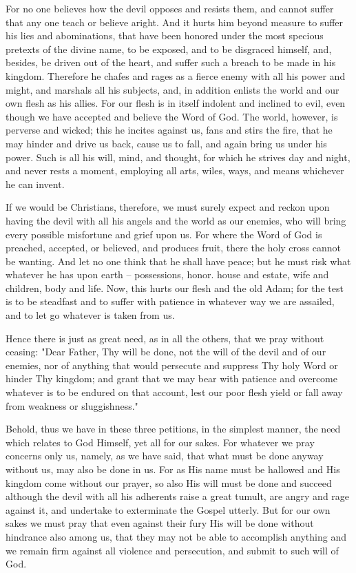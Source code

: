 For no one believes how the devil opposes and resists them, and cannot
suffer that any one teach or believe aright. And it hurts him beyond
measure to suffer his lies and abominations, that have been honored
under the most specious pretexts of the divine name, to be exposed, and
to be disgraced himself, and, besides, be driven out of the heart, and
suffer such a breach to be made in his kingdom. Therefore he chafes and
rages as a fierce enemy with all his power and might, and marshals all
his subjects, and, in addition enlists the world and our own flesh as
his allies. For our flesh is in itself indolent and inclined to evil,
even though we have accepted and believe the Word of God. The world,
however, is perverse and wicked; this he incites against us, fans and
stirs the fire, that he may hinder and drive us back, cause us to
fall, and again bring us under his power. Such is all his will, mind,
and thought, for which he strives day and night, and never rests a
moment, employing all arts, wiles, ways, and means whichever he can
invent.

If we would be Christians, therefore, we must surely expect and reckon
upon having the devil with all his angels and the world as our enemies,
who will bring every possible misfortune and grief upon us. For where
the Word of God is preached, accepted, or believed, and produces fruit,
there the holy cross cannot be wanting. And let no one think that he
shall have peace; but he must risk what whatever he has upon earth --
possessions, honor. house and estate, wife and children, body and life.
Now, this hurts our flesh and the old Adam; for the test is to be
steadfast and to suffer with patience in whatever way we are assailed,
and to let go whatever is taken from us.

Hence there is just as great need, as in all the others, that we pray
without ceasing: "Dear Father, Thy will be done, not the will of the
devil and of our enemies, nor of anything that would persecute and
suppress Thy holy Word or hinder Thy kingdom; and grant that we may
bear with patience and overcome whatever is to be endured on that
account, lest our poor flesh yield or fall away from weakness or
sluggishness."

Behold, thus we have in these three petitions, in the simplest manner,
the need which relates to God Himself, yet all for our sakes. For
whatever we pray concerns only us, namely, as we have said, that what
must be done anyway without us, may also be done in us. For as His name
must be hallowed and His kingdom come without our prayer, so also His
will must be done and succeed although the devil with all his adherents
raise a great tumult, are angry and rage against it, and undertake to
exterminate the Gospel utterly. But for our own sakes we must pray that
even against their fury His will be done without hindrance also among
us, that they may not be able to accomplish anything and we remain firm
against all violence and persecution, and submit to such will of God.

